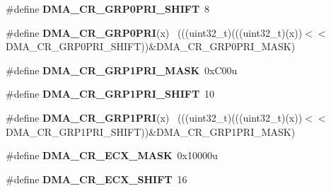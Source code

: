 \begin{DoxyCompactItemize}
\item 
\hypertarget{group___d_m_a___register___masks_ga43bd3bc2d5e07e161ddee8fa437482df}{}\#define {\bfseries D\+M\+A\+\_\+\+C\+R\+\_\+\+G\+R\+P0\+P\+R\+I\+\_\+\+S\+H\+I\+F\+T}~8\label{group___d_m_a___register___masks_ga43bd3bc2d5e07e161ddee8fa437482df}

\item 
\hypertarget{group___d_m_a___register___masks_ga8a063e536cd49cce9f7e6b86ed581696}{}\#define {\bfseries D\+M\+A\+\_\+\+C\+R\+\_\+\+G\+R\+P0\+P\+R\+I}(x)                                            ~(((uint32\+\_\+t)(((uint32\+\_\+t)(x))$<$$<$D\+M\+A\+\_\+\+C\+R\+\_\+\+G\+R\+P0\+P\+R\+I\+\_\+\+S\+H\+I\+F\+T))\&D\+M\+A\+\_\+\+C\+R\+\_\+\+G\+R\+P0\+P\+R\+I\+\_\+\+M\+A\+S\+K)\label{group___d_m_a___register___masks_ga8a063e536cd49cce9f7e6b86ed581696}

\item 
\hypertarget{group___d_m_a___register___masks_gaf4be289960b1ddd77da01933027527fa}{}\#define {\bfseries D\+M\+A\+\_\+\+C\+R\+\_\+\+G\+R\+P1\+P\+R\+I\+\_\+\+M\+A\+S\+K}~0x\+C00u\label{group___d_m_a___register___masks_gaf4be289960b1ddd77da01933027527fa}

\item 
\hypertarget{group___d_m_a___register___masks_ga7089d20c8b938fdd180b52a4aa9eada5}{}\#define {\bfseries D\+M\+A\+\_\+\+C\+R\+\_\+\+G\+R\+P1\+P\+R\+I\+\_\+\+S\+H\+I\+F\+T}~10\label{group___d_m_a___register___masks_ga7089d20c8b938fdd180b52a4aa9eada5}

\item 
\hypertarget{group___d_m_a___register___masks_gaa8a34daf44d228ae0c32950cebfd407b}{}\#define {\bfseries D\+M\+A\+\_\+\+C\+R\+\_\+\+G\+R\+P1\+P\+R\+I}(x)                                            ~(((uint32\+\_\+t)(((uint32\+\_\+t)(x))$<$$<$D\+M\+A\+\_\+\+C\+R\+\_\+\+G\+R\+P1\+P\+R\+I\+\_\+\+S\+H\+I\+F\+T))\&D\+M\+A\+\_\+\+C\+R\+\_\+\+G\+R\+P1\+P\+R\+I\+\_\+\+M\+A\+S\+K)\label{group___d_m_a___register___masks_gaa8a34daf44d228ae0c32950cebfd407b}

\item 
\hypertarget{group___d_m_a___register___masks_ga8cd29e6014e34b164ffa8ebd3287291b}{}\#define {\bfseries D\+M\+A\+\_\+\+C\+R\+\_\+\+E\+C\+X\+\_\+\+M\+A\+S\+K}~0x10000u\label{group___d_m_a___register___masks_ga8cd29e6014e34b164ffa8ebd3287291b}

\item 
\hypertarget{group___d_m_a___register___masks_ga652ead499d504b771d8c4d036ff020a8}{}\#define {\bfseries D\+M\+A\+\_\+\+C\+R\+\_\+\+E\+C\+X\+\_\+\+S\+H\+I\+F\+T}~16\label{group___d_m_a___register___masks_ga652ead499d504b771d8c4d036ff020a8}


\end{DoxyCompactItemize}
